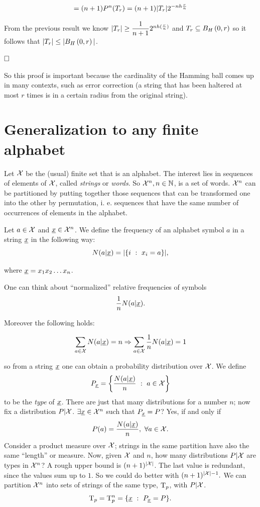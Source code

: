 \[=(n+1)P^n(T_r) = (n + 1)|T_r|2^{-nh\frac{r}{n}}\]

From the previous result we know $|T_r| \geq \dfrac{1}{n+1}2^{nh(\frac{r}{n})}$ and $T_r \subseteq B_H\left(0, r\right)$ so it follows that $|T_r| \leq |B_H\left(0, r\right)|$.

$\hfill \Box$

So this proof is important because the cardinality of the Hamming ball comes up in many contexts, such as error correction (a string that has been haltered at most $r$ times is in a certain radius from the original string).

\section{Generalization to any finite alphabet}

Let $\mathcal{X}$ be the (usual) finite set that is an alphabet. The interest lies in sequences of elements of $\mathcal{X}$, called \emph{strings} or \emph{words}. So $\mathcal{X}^n, n \in \mathbb{N}$, is a set of words. $\mathcal{X}^n$ can be partitioned by putting together those sequences that can be transformed one into the other by permutation, i. e. sequences that have the same number of occurrences of elements in the alphabet.

\begin{definition}
Let $a \in \mathcal{X}$ and $\underline{x} \in \mathcal{X}^n$. We define the frequency of an alphabet symbol $a$ in a string $\underline{x}$ in the following way:  
\begin{equation}
N(a | \underline{x}) = |\{i\ :\ x_i = a\}|,
\end{equation}

where $\underline{x} = x_1x_2\ldots x_n$.
\end{definition}
 One can think about ``normalized'' relative frequencies of symbols $$\dfrac{1}{n} N(a|\underline{x}).$$
 
Moreover the following holds:

$$\sum_{a \in \mathcal{X}} N(a|\underline{x}) = n \Rightarrow \sum_{a\in \mathcal{X}} \dfrac{1}{n}N(a|\underline{x}) = 1$$

so from a string $\underline{x}$ one can obtain a probability distribution over $\mathcal{X}$. We define
\begin{equation}
	P_{\str{x}} = \left\{ \dfrac{N(a|\str{x})}{n}\ :\ a \in \xset \right\}
\end{equation}
to be the \emph{type} of $\underline{x}$. There are just that many distributions for a number $n$; now fix a distribution $P|\mathcal{X}$. $\exists \underline{x} \in \mathcal{X}^n$ such that  $P_{\underline{x}} = P$? Yes, if and only if
$$P(a) = \dfrac{N(a | \underline{x})}{n},\ \forall a \in \mathcal{X}.$$ Consider a product measure over $\mathcal{X}$; strings in the same partition have also the same ``length'' or measure. Now, given $\mathcal{X}$ and $n$, how many distributions $P|\mathcal{X}$ are types in $\mathcal{X}^n$? A rough upper bound is $(n + 1)^{|\mathcal{X}|}$. The last value is redundant, since the values sum up to $1$. So we could do better with $(n + 1)^{|\mathcal{X}| - 1}.$ We can partition $\mathcal{X}^n$ into sets of strings of the same type, $\mathrm{T}_p$, with $P|\mathcal{X}$. $$\mathrm{T}_p = \mathrm{T}_p^n = \{\underline{x}\ :\ P_{\underline{x}} = P\}.$$

